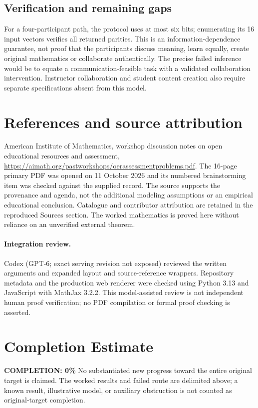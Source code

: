 \documentclass[11pt]{article}
\begin{document}
\subsection{Verification and remaining gaps}
For a four-participant path, the protocol uses at most six bits; enumerating its 16 input vectors verifies all returned parities. This is an information-dependence guarantee, not proof that the participants discuss meaning, learn equally, create original mathematics or collaborate authentically. The precise failed inference would be to equate a communication-feasible task with a validated collaboration intervention. Instructor collaboration and student content creation also require separate specifications absent from this model.

\section{References and source attribution}
American Institute of Mathematics, workshop discussion notes on open educational resources and assessment, \url{https://aimath.org/pastworkshops/oerassessmentproblems.pdf}. The 16-page primary PDF was opened on 11 October 2026 and its numbered brainstorming item was checked against the supplied record. The source supports the provenance and agenda, not the additional modeling assumptions or an empirical educational conclusion. Catalogue and contributor attribution are retained in the reproduced Sources section. The worked mathematics is proved here without reliance on an unverified external theorem.


\paragraph{Integration review.} Codex (GPT-6; exact serving revision not exposed) reviewed the written arguments and expanded layout and source-reference wrappers. Repository metadata and the production web renderer were checked using Python 3.13 and JavaScript with MathJax 3.2.2. This model-assisted review is not independent human proof verification; no PDF compilation or formal proof checking is asserted.

\section{Completion Estimate}
\noindent\textbf{COMPLETION: 0\%}
No substantiated new progress toward the entire original target is claimed. The worked results and failed route are delimited above; a known result, illustrative model, or auxiliary obstruction is not counted as original-target completion.
\end{document}
